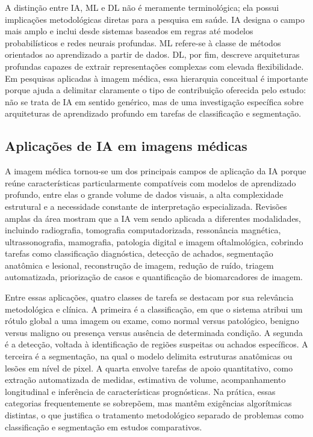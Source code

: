 \documentclass[tcc,capa]{texufpel}
\begin{document}
A distinção entre IA, ML e DL não é meramente terminológica; ela possui implicações metodológicas diretas para a pesquisa em saúde. IA designa o campo mais amplo e inclui desde sistemas baseados em regras até modelos probabilísticos e redes neurais profundas. ML refere-se à classe de métodos orientados ao aprendizado a partir de dados. DL, por fim, descreve arquiteturas profundas capazes de extrair representações complexas com elevada flexibilidade. Em pesquisas aplicadas à imagem médica, essa hierarquia conceitual é importante porque ajuda a delimitar claramente o tipo de contribuição oferecida pelo estudo: não se trata de IA em sentido genérico, mas de uma investigação específica sobre arquiteturas de aprendizado profundo em tarefas de classificação e segmentação. \cite{Rajkomar2019,Lee2017DLMedicalImaging,Yu2018AIHealthcare}

\subsection{Aplicações de IA em imagens médicas}

A imagem médica tornou-se um dos principais campos de aplicação da IA porque reúne características particularmente compatíveis com modelos de aprendizado profundo, entre elas o grande volume de dados visuais, a alta complexidade estrutural e a necessidade constante de interpretação especializada. Revisões amplas da área mostram que a IA vem sendo aplicada a diferentes modalidades, incluindo radiografia, tomografia computadorizada, ressonância magnética, ultrassonografia, mamografia, patologia digital e imagem oftalmológica, cobrindo tarefas como classificação diagnóstica, detecção de achados, segmentação anatômica e lesional, reconstrução de imagem, redução de ruído, triagem automatizada, priorização de casos e quantificação de biomarcadores de imagem. \cite{Lee2017DLMedicalImaging,Esteva2021MedCV,Aggarwal2021DLAccuracy}

Entre essas aplicações, quatro classes de tarefa se destacam por sua relevância metodológica e clínica. A primeira é a classificação, em que o sistema atribui um rótulo global a uma imagem ou exame, como normal versus patológico, benigno versus maligno ou presença versus ausência de determinada condição. A segunda é a detecção, voltada à identificação de regiões suspeitas ou achados específicos. A terceira é a segmentação, na qual o modelo delimita estruturas anatômicas ou lesões em nível de pixel. A quarta envolve tarefas de apoio quantitativo, como extração automatizada de medidas, estimativa de volume, acompanhamento longitudinal e inferência de características prognósticas. Na prática, essas categorias frequentemente se sobrepõem, mas mantêm exigências algorítmicas distintas, o que justifica o tratamento metodológico separado de problemas como classificação e segmentação em estudos comparativos. \cite{Esteva2021MedCV,Lee2017DLMedicalImaging}
\end{document}

